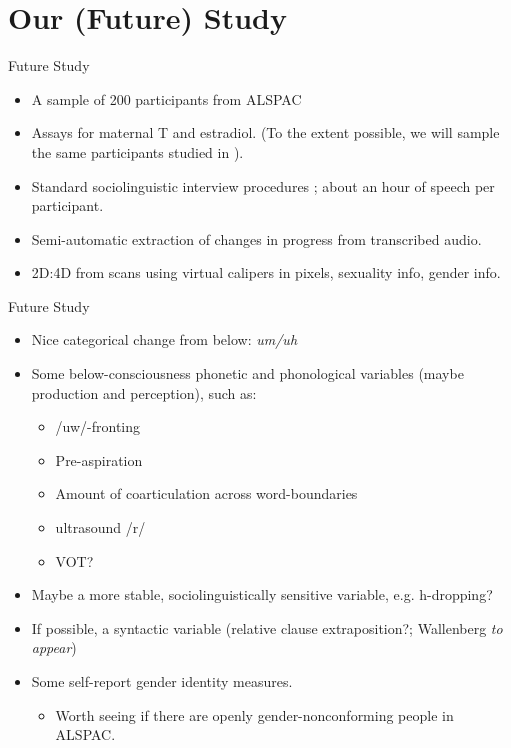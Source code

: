 \documentclass[hyperref={pdfpagelabels=false}]{beamer}
\begin{document}
\section{Our (Future) Study}

\begin{frame}{Future Study}
\begin{itemize}
	\item A sample of 200 participants from ALSPAC
	\item Assays for maternal T and estradiol. (To the extent possible, we will sample the same participants studied in \citealt{hinesetal2002}). 
	\item Standard sociolinguistic interview procedures \citep{tagliamonte2006}; about an hour of speech per participant.
	\item Semi-automatic extraction of changes in progress from transcribed audio.
	\item 2D:4D from scans using virtual calipers in pixels, sexuality info, gender info.
\end{itemize}
\end{frame}

\begin{frame}{Future Study}
\begin{itemize}
	
	\item Nice categorical change from below: \textsl{um/uh}
	\item Some below-consciousness phonetic and phonological variables (maybe production and perception), such as:
			\begin{itemize}
			\item /uw/-fronting
			\item Pre-aspiration
			\item Amount of coarticulation across word-boundaries
			\item ultrasound /r/
			\item VOT?
			
			\end{itemize}
	\item Maybe a more stable, sociolinguistically sensitive variable, e.g. h-dropping?
	\item If possible, a syntactic variable (relative clause extraposition?; Wallenberg \textsl{to appear})

	\item Some self-report gender identity measures.
		\begin{itemize}
			\item Worth seeing if there are openly gender-nonconforming people in ALSPAC.
		\end{itemize}
		\end{itemize}

\end{frame}
\end{document}
